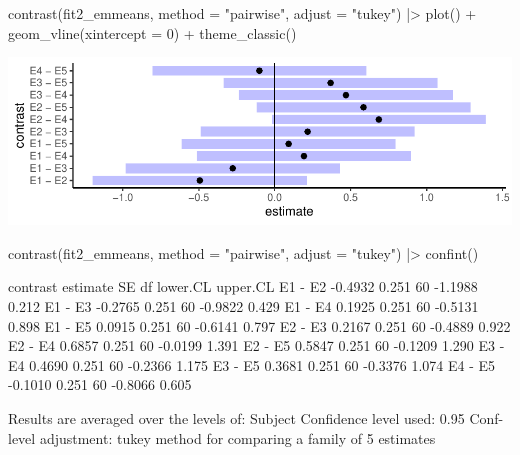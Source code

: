 \documentclass[a4paper]{article}\usepackage[]{graphicx}\usepackage[]{xcolor}
\makeatletter
\def\maxwidth{ %
  \ifdim\Gin@nat@width>\linewidth
    \linewidth
  \else
    \Gin@nat@width
  \fi
}
\makeatother
\begin{document}
\begin{Schunk}
\begin{Sinput}
contrast(fit2_emmeans, method = "pairwise", adjust = "tukey") |> 
  plot() + geom_vline(xintercept = 0) +
  theme_classic()
\end{Sinput}


{\centering \includegraphics[width=\maxwidth]{figure/listings-unnamed-chunk-295-1} 

}

\begin{Sinput}
contrast(fit2_emmeans, method = "pairwise", adjust = "tukey") |> confint()
\end{Sinput}
\begin{Soutput}
 contrast estimate    SE df lower.CL upper.CL
 E1 - E2   -0.4932 0.251 60  -1.1988    0.212
 E1 - E3   -0.2765 0.251 60  -0.9822    0.429
 E1 - E4    0.1925 0.251 60  -0.5131    0.898
 E1 - E5    0.0915 0.251 60  -0.6141    0.797
 E2 - E3    0.2167 0.251 60  -0.4889    0.922
 E2 - E4    0.6857 0.251 60  -0.0199    1.391
 E2 - E5    0.5847 0.251 60  -0.1209    1.290
 E3 - E4    0.4690 0.251 60  -0.2366    1.175
 E3 - E5    0.3681 0.251 60  -0.3376    1.074
 E4 - E5   -0.1010 0.251 60  -0.8066    0.605

Results are averaged over the levels of: Subject 
Confidence level used: 0.95 
Conf-level adjustment: tukey method for comparing a family of 5 estimates 
\end{Soutput}
\end{Schunk}
\end{document}
